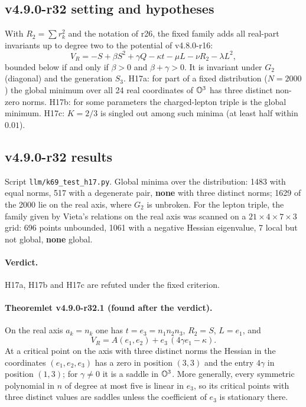 \subsection*{v4.9.0-r32 setting and hypotheses}
\label{subsec:v490-r32-setting}

With \(R_2=\sum r_k^2\) and the notation of r26, the fixed family adds all real-part invariants up to degree two to the
potential of v4.8.0-r16:
\[
V_R=-S+\beta S^2+\gamma Q-\kappa t-\mu L-\nu R_2-\lambda L^2 ,
\]
bounded below if and only if \(\beta>0\) and \(\beta+\gamma>0\).  It is invariant under \(G_2\) (diagonal) and the
generation \(S_3\).  H17a: for part of a fixed distribution (\(N=2000\)) the global minimum over all 24 real
coordinates of \(\mathbb{O}^3\) has three distinct non-zero norms.  H17b: for some parameters the charged-lepton triple is the
global minimum.  H17c: \(K=2/3\) is singled out among such minima (at least half within \(0.01\)).

\subsection*{v4.9.0-r32 results}
\label{subsec:v490-r32-results}

Script \texttt{llm/k69\_test\_h17.py}.  Global minima over the distribution: 1483 with equal norms, 517 with a degenerate
pair, \textbf{none} with three distinct norms; 1629 of the 2000 lie on the real axis, where \(G_2\) is unbroken.  For the
lepton triple, the family given by Vieta's relations on the real axis was scanned on a \(21\times4\times7\times3\) grid:
696 points unbounded, 1061 with a negative Hessian eigenvalue, 7 local but not global, \textbf{none} global.

\paragraph{Verdict.}
H17a, H17b and H17c are refuted under the fixed criterion.

\paragraph{Theoremlet v4.9.0-r32.1 (found after the verdict).}
On the real axis \(a_k=n_k\) one has \(t=e_3=n_1n_2n_3\), \(R_2=S\), \(L=e_1\), and
\[
V_R=A(e_1,e_2)+e_3\,(4\gamma e_1-\kappa).
\]
At a critical point on the axis with three distinct norms the Hessian in the coordinates \((e_1,e_2,e_3)\) has a zero
in position \((3,3)\) and the entry \(4\gamma\) in position \((1,3)\); for \(\gamma\neq0\) it is a saddle in
\(\mathbb{O}^3\).  More generally, every symmetric polynomial in \(n\) of degree at most five is linear in \(e_3\), so its
critical points with three distinct values are saddles unless the coefficient of \(e_3\) is stationary there.

